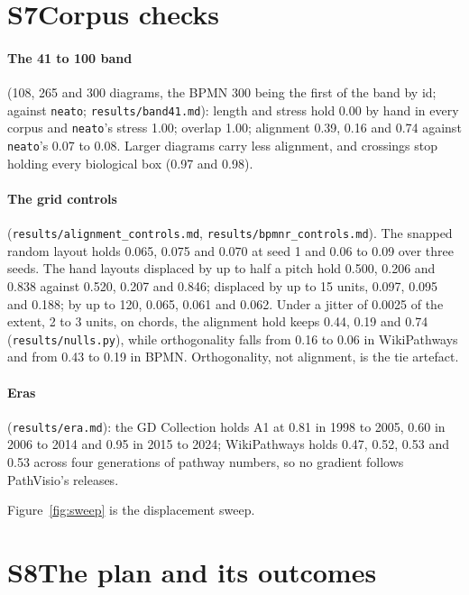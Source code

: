 \documentclass[11pt]{article}
\begin{document}
\section*{S7\quad Corpus checks}

\paragraph{The 41 to 100 band} (108, 265 and 300 diagrams, the BPMN 300 being the first
of the band by id; against \texttt{neato}; \texttt{results/band41.md}): length and stress
hold 0.00 by hand in every corpus and \texttt{neato}'s stress 1.00; overlap 1.00;
alignment 0.39, 0.16 and 0.74 against \texttt{neato}'s 0.07 to 0.08. Larger diagrams
carry less alignment, and crossings stop holding every biological box (0.97 and 0.98).

\paragraph{The grid controls} (\texttt{results/alignment\_controls.md},
\texttt{results/bpmnr\_controls.md}). The snapped random layout holds 0.065, 0.075 and
0.070 at seed 1 and 0.06 to 0.09 over three seeds. The hand layouts displaced by up to
half a pitch hold 0.500, 0.206 and 0.838 against 0.520, 0.207 and 0.846; displaced by up
to 15 units, 0.097, 0.095 and 0.188; by up to 120, 0.065, 0.061 and 0.062. Under a jitter
of 0.0025 of the extent, 2 to 3 units, on chords, the alignment hold keeps 0.44, 0.19 and
0.74 (\texttt{results/nulls.py}), while orthogonality falls from 0.16 to 0.06 in
WikiPathways and from 0.43 to 0.19 in BPMN. Orthogonality, not alignment, is the tie
artefact.

\paragraph{Eras} (\texttt{results/era.md}): the GD Collection holds A1 at 0.81 in
1998 to 2005, 0.60 in 2006 to 2014 and 0.95 in 2015 to 2024; WikiPathways holds 0.47, 0.52, 0.53 and 0.53
across four generations of pathway numbers, so no gradient follows PathVisio's releases.

Figure~\ref{fig:sweep} is the displacement sweep.



\section*{S8\quad The plan and its outcomes}
\end{document}
